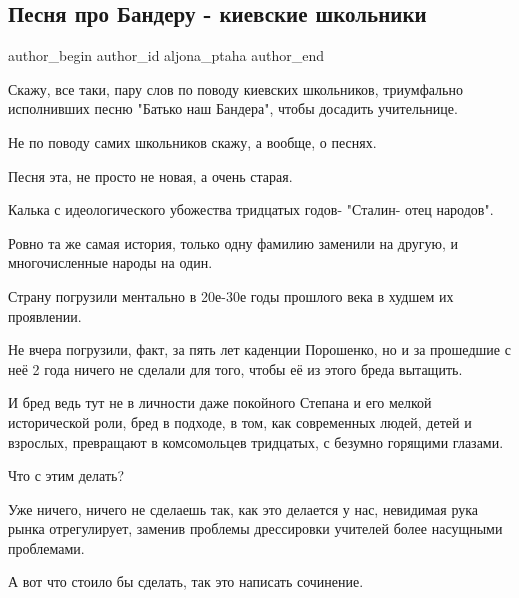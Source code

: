  
 
 
 
 
 
\subsection{Песня про Бандеру - киевские школьники}
\label{sec:13_10_2021.fb.aljona_ptaha.1.pesnja_bandera_shkolniki}
 
\ifcmt
 author_begin
   author_id aljona_ptaha
 author_end
\fi

Скажу, все таки, пару слов по поводу киевских школьников, триумфально
исполнивших песню "Батько наш Бандера", чтобы досадить учительнице.

Не по поводу самих школьников скажу, а вообще, о песнях.

Песня эта, не просто не новая, а очень старая.

Калька с идеологического убожества тридцатых годов- "Сталин- отец народов".

Ровно та же самая история, только одну фамилию заменили на другую, и
многочисленные народы на один.

Страну погрузили ментально в 20е-30е годы прошлого века в худшем их проявлении.

Не вчера погрузили, факт, за пять лет каденции Порошенко, но и за прошедшие с
неё 2 года ничего не сделали для того, чтобы её из этого бреда вытащить.

И бред ведь тут не в личности даже покойного Степана и его мелкой исторической
роли, бред в подходе, в том, как современных людей, детей и взрослых,
превращают в комсомольцев тридцатых, с безумно горящими глазами.

Что с этим делать?

Уже ничего, ничего не сделаешь так, как это делается у нас, невидимая рука
рынка отрегулирует, заменив проблемы дрессировки учителей более насущными
проблемами.

А вот что стоило бы сделать, так это написать сочинение.

